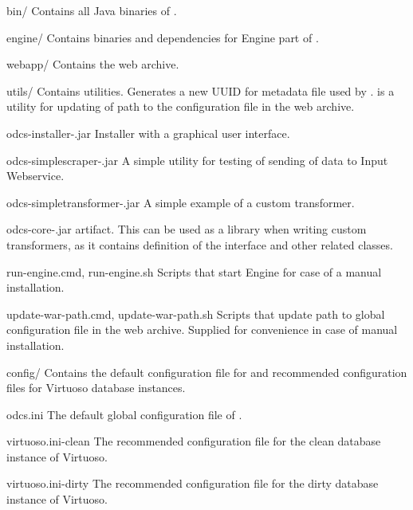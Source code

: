\begin{dirlistbrief}
    \item[bin/] Contains all Java binaries of \odcs.
        \begin{dirlist}
            \item[engine/] Contains binaries and dependencies for Engine part of \odcs.
            \item[webapp/] Contains the \FE web archive.
            \item[utils/] Contains utilities.  Generates a new UUID for metadata file used by .  is a utility for updating of path to the \odcs configuration file in the \FE web archive.
            \item[odcs-installer-\varcode{version}.jar] Installer with a graphical user interface.
            \item[odcs-simplescraper-\varcode{version}.jar] A simple utility for testing of sending of data to Input Webservice.
            \item[odcs-simpletransformer-\varcode{version}.jar] A simple example of a custom transformer.
            \item[odcs-core-\varcode{version}.jar]  artifact. This can be used as a library when writing custom transformers, as it contains definition of the  interface and other related classes.
            \item[run-engine.cmd, run-engine.sh] Scripts that start Engine for case of a manual installation.
            \item[update-war-path.cmd, update-war-path.sh] Scripts that update path to global configuration file in the \FE web archive. Supplied for convenience in case of manual installation.
        \end{dirlist}
    \item[config/] Contains the default configuration file for \odcs and recommended configuration files for Virtuoso database instances.
        \begin{dirlist}
            \item[odcs.ini] The default global configuration file of \odcs.
            \item[virtuoso.ini-clean] The recommended configuration file for the clean database instance of Virtuoso.
            \item[virtuoso.ini-dirty] The recommended configuration file for the dirty database instance of Virtuoso.
        \end{dirlist}

\end{dirlistbrief}
